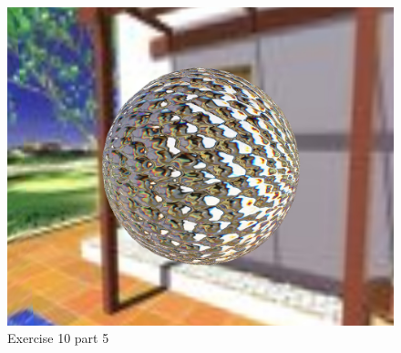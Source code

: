 \begin{figure}[ht!]
	\begin{center}
		\includegraphics[width=1.0\textwidth]{figures/exercise_10_5}
	\end{center}
	\vspace{-4.5ex}\caption{Exercise 10 part 5}
	\label{fig:exercise_10_5} 
\end{figure}
